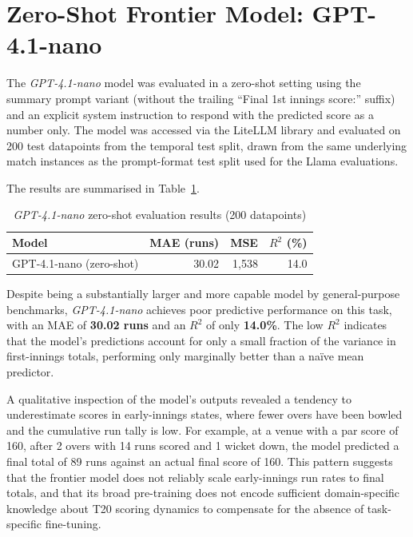 \section{Zero-Shot Frontier Model: GPT-4.1-nano}

The \textit{GPT-4.1-nano} model was evaluated in a zero-shot setting using the summary prompt variant (without the trailing ``Final 1st innings score:'' suffix) and an explicit system instruction to respond with the predicted score as a number only. The model was accessed via the LiteLLM library and evaluated on 200 test datapoints from the temporal test split, drawn from the same underlying match instances as the prompt-format test split used for the Llama evaluations.

The results are summarised in Table~\ref{tab:gpt_results}.

\begin{table}[ht]
\centering
\caption{\textit{GPT-4.1-nano} zero-shot evaluation results (200 datapoints)}
\label{tab:gpt_results}
\begin{tabular}{lrrr}
\hline
\textbf{Model} & \textbf{MAE (runs)} & \textbf{MSE} & \textbf{$R^2$ (\%)} \\
\hline
GPT-4.1-nano (zero-shot) & 30.02 & 1,538 & 14.0 \\
\hline
\end{tabular}
\end{table}

Despite being a substantially larger and more capable model by general-purpose benchmarks, \textit{GPT-4.1-nano} achieves poor predictive performance on this task, with an MAE of \textbf{30.02 runs} and an $R^2$ of only \textbf{14.0\%}. The low $R^2$ indicates that the model's predictions account for only a small fraction of the variance in first-innings totals, performing only marginally better than a naïve mean predictor.

A qualitative inspection of the model's outputs revealed a tendency to underestimate scores in early-innings states, where fewer overs have been bowled and the cumulative run tally is low. For example, at a venue with a par score of 160, after 2 overs with 14 runs scored and 1 wicket down, the model predicted a final total of 89 runs against an actual final score of 160. This pattern suggests that the frontier model does not reliably scale early-innings run rates to final totals, and that its broad pre-training does not encode sufficient domain-specific knowledge about T20 scoring dynamics to compensate for the absence of task-specific fine-tuning.

